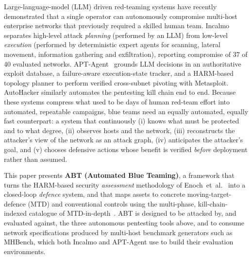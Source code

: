 \documentclass[conference]{IEEEtran}
\begin{document}
Large-language-model (LLM) driven red-teaming systems have recently demonstrated that
a single operator can autonomously compromise multi-host enterprise networks that
previously required a skilled human team. Incalmo~\cite{incalmo2025} separates
high-level attack \emph{planning} (performed by an LLM) from low-level
\emph{execution} (performed by deterministic expert agents for scanning, lateral
movement, information gathering and exfiltration), reporting compromise of 37 of 40
evaluated networks. APT-Agent~\cite{aptagent2026} grounds LLM decisions in an
authoritative exploit database, a failure-aware execution-state tracker, and a
HARM-based topology planner to perform verified cross-subnet pivoting with Metasploit.
AutoHacker similarly automates the pentesting kill chain end to end. Because these
systems compress what used to be days of human red-team effort into automated,
repeatable campaigns, blue teams need an equally automated, equally fast
counterpart: a system that continuously (i) knows what must be protected and to what
degree, (ii) observes hosts and the network, (iii) reconstructs the attacker's view
of the network as an attack graph, (iv) anticipates the attacker's goal, and
(v) chooses defensive actions whose benefit is verified \emph{before} deployment
rather than assumed.

This paper presents \textbf{ABT (Automated Blue Teaming)}, a framework that turns the
HARM-based security \emph{assessment} methodology of Enoch~et~al.~\cite{harmer2020,
maritime2021} into a closed-loop \emph{defence} system, and that maps assets to
concrete moving-target-defence (MTD) and conventional controls using the multi-phase,
kill-chain-indexed catalogue of MTD-in-depth~\cite{mtdindepth2026}. ABT is designed to
be attacked by, and evaluated against, the three autonomous pentesting tools above,
and to consume network specifications produced by multi-host benchmark generators such
as MHBench, which both Incalmo and APT-Agent use to build their evaluation
environments.
\end{document}
